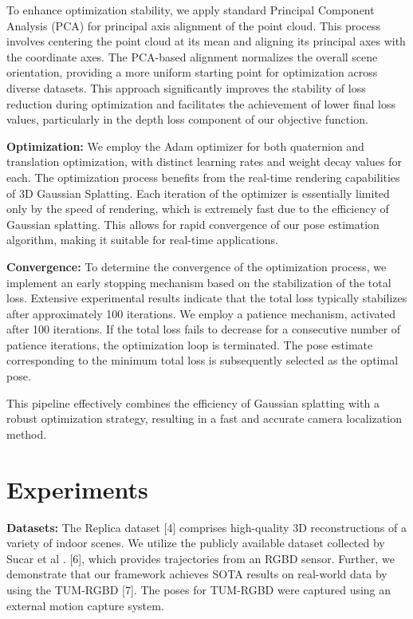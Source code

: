\documentclass[twocolumn]{article} %
\begin{document}
To enhance optimization stability, we apply standard Principal Component
Analysis (PCA) for principal axis alignment of the point cloud. This
process involves centering the point cloud at its mean and aligning its
principal axes with the coordinate axes. The PCA-based alignment
normalizes the overall scene orientation, providing a more uniform
starting point for optimization across diverse datasets. This approach
significantly improves the stability of loss reduction during
optimization and facilitates the achievement of lower final loss values,
particularly in the depth loss component of our objective function.

\textbf{Optimization:} We employ the Adam optimizer for both quaternion
and translation optimization, with distinct learning rates and weight
decay values for each. The optimization process benefits from the
real-time rendering capabilities of 3D Gaussian Splatting. Each
iteration of the optimizer is essentially limited only by the speed of
rendering, which is extremely fast due to the efficiency of Gaussian
splatting. This allows for rapid convergence of our pose estimation
algorithm, making it suitable for real-time applications.

\textbf{Convergence:} To determine the convergence of the optimization
process, we implement an early stopping mechanism based on the
stabilization of the total loss. Extensive experimental results indicate
that the total loss typically stabilizes after approximately 100
iterations. We employ a patience mechanism, activated after 100
iterations. If the total loss fails to decrease for a consecutive number
of patience iterations, the optimization loop is terminated. The pose
estimate corresponding to the minimum total loss is subsequently
selected as the optimal pose.

This pipeline effectively combines the efficiency of Gaussian splatting
with a robust optimization strategy, resulting in a fast and accurate
camera localization method.

\section{Experiments}\label{experiments}

\textbf{Datasets:} The Replica dataset {[}4{]} comprises high-quality 3D
reconstructions of a variety of indoor scenes. We utilize the publicly
available dataset collected by Sucar et al . {[}6{]}, which provides
trajectories from an RGBD sensor. Further, we demonstrate that our
framework achieves SOTA results on real-world data by using the TUM-RGBD
{[}7{]}. The poses for TUM-RGBD were captured using an external motion
capture system.
\end{document}
